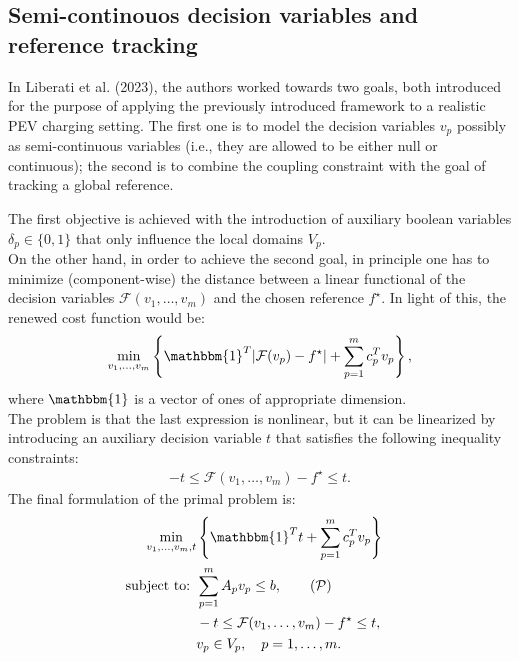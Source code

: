 \subsection{Semi-continouos decision variables and reference tracking}
In Liberati et al. (2023)\supercite{liberati}, the authors worked towards two goals, both introduced for the purpose of applying the previously introduced framework to a realistic PEV charging setting. The first one is to model the decision variables $v_p$ possibly as semi-continuous variables (i.e., they are allowed to be either null or continuous); the second is to combine the coupling constraint with the goal of tracking a global reference.

The first objective is achieved with the introduction of auxiliary boolean variables $\delta_p \in \{0,1\}$ that only influence the local domains $V_p$.\\
On the other hand, in order to achieve the second goal, in principle one has to minimize (component-wise) the distance between a linear functional of the decision variables $\mathcal{F} (v_1, \dots, v_m)$ and the chosen reference $f^\star$. In light of this, the renewed cost function would be:
\begin{align*}
    \min_{v_1, \dots, v_m} \left\{ \mathbbm{1}^T |\mathcal{F} (v_p) - f^\star| + \sum_{p = 1}^m c_p^T v_p\right\},
\end{align*}
where $\mathbbm{1}$ is a vector of ones of appropriate dimension.\\
The problem is that the last expression is nonlinear, but it can be linearized by introducing an auxiliary decision variable $t$ that satisfies the following inequality constraints:
\begin{align*}
    -t \leq \mathcal{F} (v_1, \dots, v_m) - f^\star \leq t.
\end{align*}
The final formulation of the primal problem is:
\begin{align*}
    \min_{v_1, \dots, v_m, t} & \left\{ \mathbbm{1}^T t + \sum_{p = 1}^m c_p^T v_p\right\} \\
    \text{subject to: } & \sum_{p=1}^{m} A_p v_p \leq b, \tag{$\mathcal{P}$} \label{eq:MILP_liberati} \\ 
    & -t \leq \mathcal{F} (v_1, \dots, v_m) - f^\star \leq t, \quad \\
    & v_p \in V_p, \quad p = 1, \dots, m.
\end{align*}

